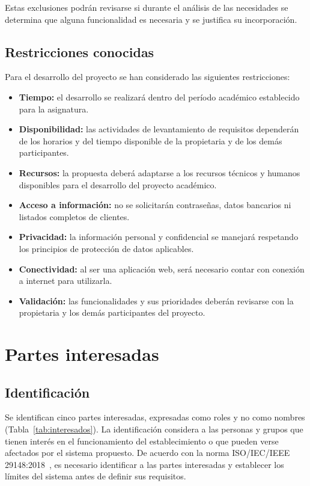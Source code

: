 \documentclass[11pt,a4paper]{article}
\begin{document}
	Estas exclusiones podrán revisarse si durante el análisis de las necesidades se determina que alguna funcionalidad es necesaria y se justifica su incorporación.
	
	\subsection{Restricciones conocidas}
	
	Para el desarrollo del proyecto se han considerado las siguientes restricciones:
	
	\begin{itemize}
		\item \textbf{Tiempo:} el desarrollo se realizará dentro del período académico establecido para la asignatura.
		\item \textbf{Disponibilidad:} las actividades de levantamiento de requisitos dependerán de los horarios y del tiempo disponible de la propietaria y de los demás participantes.
		\item \textbf{Recursos:} la propuesta deberá adaptarse a los recursos técnicos y humanos disponibles para el desarrollo del proyecto académico.
		\item \textbf{Acceso a información:} no se solicitarán contraseñas, datos bancarios ni listados completos de clientes.
		\item \textbf{Privacidad:} la información personal y confidencial se manejará respetando los principios de protección de datos aplicables.
		\item \textbf{Conectividad:} al ser una aplicación web, será necesario contar con conexión a internet para utilizarla.
		\item \textbf{Validación:} las funcionalidades y sus prioridades deberán revisarse con la propietaria y los demás participantes del proyecto.
	\end{itemize}
	
	
	\section{Partes interesadas}
	
	
	\subsection{Identificación}
	
	Se identifican cinco partes interesadas, expresadas como roles y no como nombres (Tabla~\ref{tab:interesados}). La identificación considera a las personas y grupos que tienen interés en el funcionamiento del establecimiento o que pueden verse afectados por el sistema propuesto. De acuerdo con la norma ISO/IEC/IEEE 29148:2018~\cite{iso29148}, es necesario identificar a las partes interesadas y establecer los límites del sistema antes de definir sus requisitos.
	
\end{document}
